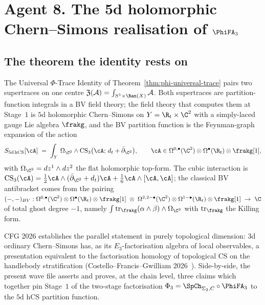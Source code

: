 
\section*{Agent 8. The 5d holomorphic Chern--Simons realisation of \texorpdfstring{$\PhiFA_3$}{Phi-FA-3}}
\label{sec:wave-cfg-agent-8}

\subsection*{The theorem the identity rests on}

The Universal $\Phi$-Trace Identity of
Theorem~\ref{thm:phi-universal-trace} pairs two supertraces on one
centre $\mathfrak{Z}(\mathcal{A}) = \int_{S^1 \times \Ran(X)}\mathcal{A}$.
Both supertraces are partition-function integrals in a BV field theory;
the field theory that computes them at Stage~$1$ is $5$d holomorphic
Chern--Simons on $Y = \R_t \times \C^2$ with a simply-laced gauge Lie
algebra $\frakg$, and the BV partition function is the Feynman-graph
expansion of the action
\begin{equation}
\label{eq:5d-hCS-action}
  S_{5\mathrm{d\,hCS}}[\cA] \;=\; \int_{Y}\,
  \Omega_{\C^2}\wedge \operatorname{CS}_3\bigl(\cA;\, d_t + \bar\partial_{\C^2}\bigr),
\qquad
  \cA \in \Omega^{0,\bullet}(\C^2)\otimes\Omega^\bullet(\R_t)\otimes \frakg[1],
\end{equation}
with $\Omega_{\C^2} = dz^1\wedge dz^2$ the flat holomorphic top-form.
The cubic interaction is
$\operatorname{CS}_3(\cA) = \tfrac{1}{2}\cA\wedge(\bar\partial_{\C^2}+d_t)\cA
+ \tfrac{1}{6}\cA\wedge[\cA,\cA]$; the classical BV antibracket comes
from the pairing
$(-,-)_{BV} : \Omega^{0,\bullet}(\C^2) \otimes \Omega^\bullet(\R_t)
\otimes\frakg[1]\; \otimes\; \Omega^{2,2-\bullet}(\C^2)
\otimes\Omega^{1-\bullet}(\R_t)\otimes\frakg[1] \;\to\; \C$
of total ghost degree $-1$, namely $\int \mathrm{tr}_\frakg(\alpha\wedge\beta)
\wedge \Omega_{\C^2}$ with $\mathrm{tr}_\frakg$ the Killing form.

CFG 2026 establishes the parallel statement in purely topological
dimension: $3$d ordinary Chern--Simons has, as its $E_3$-factorisation
algebra of local observables, a presentation equivalent to the
factorisation homology of topological CS on the handlebody stratification
(Costello--Francis--Gwilliam 2026~\cite{CFG2026}). Side-by-side, the
present wave file asserts and proves, at the chain level, three
claims which together pin Stage~$1$ of the two-stage factorisation
$\Phi_3 = \SpCh_{\Sigma_2,C}\circ\PhiFA_3$ to the $5$d hCS partition
function.

